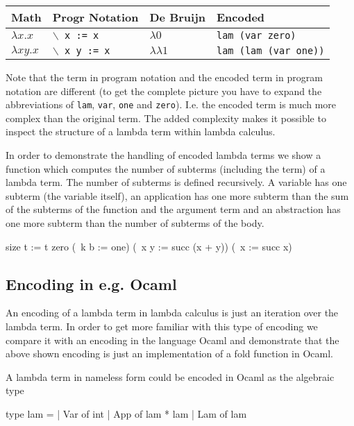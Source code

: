 \documentclass[12pt]{article}
\begin{document}
\begin{tabular}[t]{|l|l|l|l|}
    \hline
    Math
    & Progr Notation
    & De Bruijn
    & Encoded
    \\
    \hline
    $\lambda x. x$
    & {\tt $\backslash$ x := x}
    & $\lambda 0$
    & {\tt lam (var zero)}
    \\
    \hline
    $\lambda x y. x$
    & {\tt $\backslash$ x y := x}
    & $\lambda \lambda 1$
    & {\tt lam (lam (var one))}
    \\
    \hline
\end{tabular}

Note that the term in program notation and the encoded term in program notation
are different (to get the complete picture you have to expand the abbreviations
of {\tt lam}, {\tt var}, {\tt one} and {\tt zero}). I.e. the encoded term is
much more complex than the original term. The added complexity makes it possible
to inspect the structure of a lambda term within lambda calculus.


In order to demonstrate the handling of encoded lambda terms we show a function
which computes the number of subterms (including the term) of a lambda term.
The number of subterms is defined recursively. A variable has one subterm (the
variable itself), an application has one more subterm than the sum of the
subterms of the function and the argument term and an abstraction has one more
subterm than the number of subterms of the body.


\begin{lam}
    size t :=
        t
            zero
            (\ k b := one)
            (\ x y := succ (x + y))
            (\ x := succ x)
\end{lam}




\subsection{Encoding in e.g. Ocaml}


An encoding of a lambda term in lambda calculus is just an iteration over the
lambda term. In order to get more familiar with this type of encoding we
compare it with an encoding in the language Ocaml and demonstrate that the above
shown encoding is just an implementation of a fold function in Ocaml.

A lambda term in nameless form could be encoded in Ocaml as the algebraic type
\begin{ocaml}
    type lam =
        | Var of int
        | App of lam * lam
        | Lam of lam
\end{ocaml}
\end{document}
